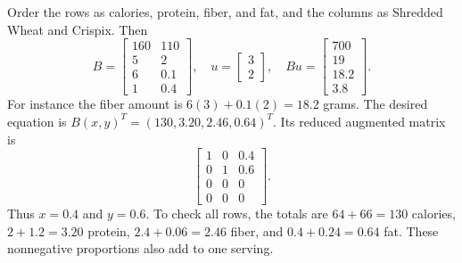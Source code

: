 Order the rows as calories, protein, fiber, and fat, and the columns
as Shredded Wheat and Crispix. Then
\[
 B=\begin{bmatrix}160&110\\5&2\\6&0.1\\1&0.4\end{bmatrix},\quad
 u=\begin{bmatrix}3\\2\end{bmatrix},\quad
 Bu=\begin{bmatrix}700\\19\\18.2\\3.8\end{bmatrix}.
\]
For instance the fiber amount is $6(3)+0.1(2)=18.2$ grams.
The desired equation is $B(x,y)^T=(130,3.20,2.46,0.64)^T$.
Its reduced augmented matrix is
\[
 \begin{bmatrix}1&0&0.4\\0&1&0.6\\0&0&0\\0&0&0\end{bmatrix}.
\]
Thus $x=0.4$ and $y=0.6$. To check all rows, the totals are
$64+66=130$ calories, $2+1.2=3.20$ protein, $2.4+0.06=2.46$
fiber, and $0.4+0.24=0.64$ fat. These nonnegative proportions
also add to one serving.


